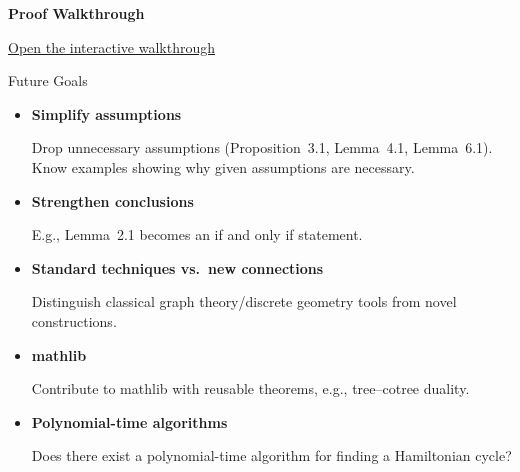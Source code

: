 \documentclass[aspectratio=169,12pt,t]{beamer}
\begin{document}
\begin{frame}[plain,c]
  \centering
  {\LARGE\bfseries Proof Walkthrough\par}
  \vspace{0.75em}
  {\small\href{https://tomodovodoo.github.io/mathathon-Barnette-s-Conjecture/barnette-proof-walkthrough.html}{\textcolor{cyclecolor}{\underline{Open the interactive walkthrough}}}\par}
\end{frame}

\begin{frame}[c]{Future Goals}
  \setlength{\leftmargini}{1em}
  \begin{itemize}
    \setlength{\itemsep}{0.7em}
    \item {\bfseries Simplify assumptions}\par
      Drop unnecessary assumptions (Proposition~3.1, Lemma~4.1, Lemma~6.1). Know examples showing why given assumptions are necessary.
    \item {\bfseries Strengthen conclusions}\par
      E.g., Lemma~2.1 becomes an if and only if statement.
    \item {\bfseries Standard techniques vs.\ new connections}\par
      Distinguish classical graph theory/discrete geometry tools from novel constructions.
    \item {\bfseries mathlib}\par
      Contribute to mathlib with reusable theorems, e.g., tree--cotree duality.
    \item {\bfseries Polynomial-time algorithms}\par
      Does there exist a polynomial-time algorithm for finding a Hamiltonian cycle?
  \end{itemize}
\end{frame}
\end{document}
